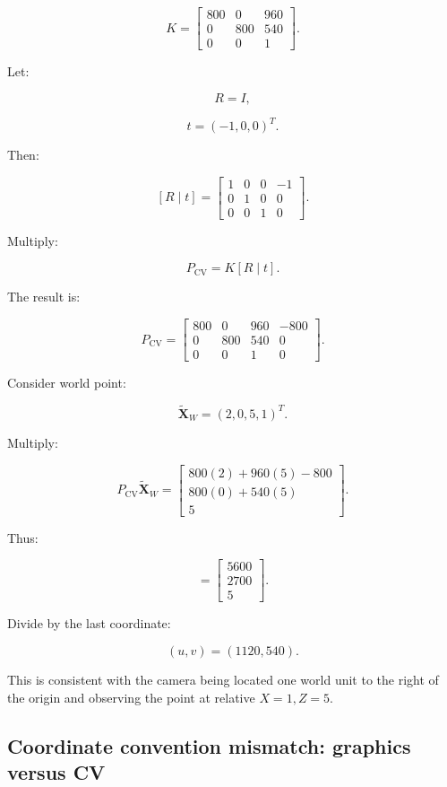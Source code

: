 \[
 K= \begin{bmatrix} 800&0&960\\ 0&800&540\\ 0&0&1 \end{bmatrix}.
\]

Let:

\[
 R=I,
\]

\[
 t=(-1,0,0)^T.
\]

Then:

\[
 [R\mid t] = \begin{bmatrix} 1&0&0&-1\\ 0&1&0&0\\ 0&0&1&0 \end{bmatrix}.
\]

Multiply:

\[
 P_{\mathrm{CV}}= K[R\mid t].
\]

The result is:

\[
 \boxed{ P_{\mathrm{CV}}= \begin{bmatrix} 800&0&960&-800\\ 0&800&540&0\\ 0&0&1&0 \end{bmatrix} }.
\]

Consider world point:

\[
 \tilde{\mathbf X}_W=(2,0,5,1)^T.
\]

Multiply:

\[
 P_{\mathrm{CV}}\tilde{\mathbf X}_W = \begin{bmatrix} 800(2)+960(5)-800\\ 800(0)+540(5)\\ 5 \end{bmatrix}.
\]

Thus:

\[
 = \begin{bmatrix} 5600\\2700\\5 \end{bmatrix}.
\]

Divide by the last coordinate:

\[
 \boxed{ (u,v)=(1120,540) }.
\]

This is consistent with the camera being located one world unit to the right of the origin and observing the point at relative \(X=1,Z=5\).

\subsection{Coordinate convention mismatch: graphics versus CV}\label{02-foundations-ii-ch035-coordinate-convention-mismatch-graphics-versus-cv}

